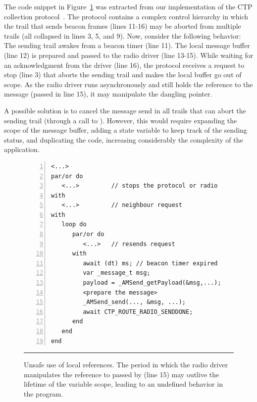 The code snippet in Figure~\ref{lst.local} was extracted from our 
implementation of the CTP collection protocol~\cite{wsn.teps}.
The protocol contains a complex control hierarchy in which the trail that sends 
beacon frames (lines 11-16) may be aborted from multiple  trails 
(all collapsed in lines 3, 5, and 9).
%
Now, consider the following behavior:
The sending trail awakes from a beacon timer (line 11).
The local message buffer (line 12) is prepared and passed to the radio driver 
(line 13-15).
While waiting for an acknowledgment from the driver (line 16), the protocol 
receives a request to stop (line 3) that aborts the sending trail and makes the 
local buffer go out of scope.
As the radio driver runs asynchronously and still holds the reference to the 
message (passed in line 15), it may manipulate the dangling pointer.
%

%
A possible solution is to cancel the message send in all trails that can abort 
the sending trail (through a call to ).
However, this would require expanding the scope of the message buffer, adding a 
state variable to keep track of the sending status, and duplicating the code, 
increasing considerably the complexity of the application.

\begin{figure}[t]
\begin{lstlisting}[numbers=left,xleftmargin=2em]
<...>
par/or do
   <...>         // stops the protocol or radio
with
   <...>         // neighbour request
with
   loop do
      par/or do
         <...>   // resends request
      with
         await (dt) ms; // beacon timer expired
         var _message_t msg;
         payload = _AMSend_getPayload(&msg,...);
         <prepare the message>
         _AMSend_send(..., &msg, ...);
         await CTP_ROUTE_RADIO_SENDDONE;
      end
   end
end
\end{lstlisting}
%
\rule{14cm}{0.37pt}
\caption{ Unsafe use of local references. \newline
{\small %
The period in which the radio driver manipulates the reference to  
passed by  (line 15) may outlive the lifetime of the 
variable scope, leading to an undefined behavior in the program.
}%
\label{lst.local}
}
\end{figure}

